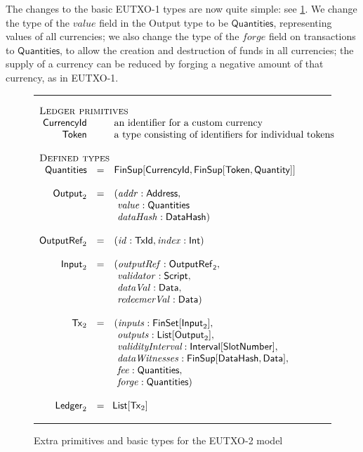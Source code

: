 \documentclass[a4paper]{article}
\renewcommand{\i}{\textit}  %
\newcommand{\s}{\textsf}  %
\newcommand{\msf}[1]{\ensuremath{\mathsf{#1}}}
\newcommand{\mi}[1]{\ensuremath{\mathit{#1}}}
\newcommand\rfskip{7pt}
\newenvironment{ruledfigure}[1]{\begin{figure}[#1]\hrule\vspace{\rfskip}}{\vspace{\rfskip}\hrule\end{figure}}
\newcommand{\List}[1]{\ensuremath{\s{List}[#1]}}
\newcommand{\FinSet}[1]{\ensuremath{\s{FinSet}[#1]}}
\newcommand{\Interval}[1]{\ensuremath{\s{Interval}[#1]}}
\newcommand{\FinSup}[2]{\ensuremath{\s{FinSup}[#1,#2]}}
\newcommand{\script}{\ensuremath{\s{Script}}}
\newcommand{\TxId}{\ensuremath{\s{TxId}}}
\newcommand{\txrefid}{\mi{id}}
\newcommand{\Address}{\ensuremath{\s{Address}}}
\newcommand{\DataHash}{\ensuremath{\s{DataHash}}}
\newcommand{\idx}{\mi{index}}
\newcommand{\inputs}{\mi{inputs}}
\newcommand{\outputs}{\mi{outputs}}
\newcommand{\forge}{\mi{forge}}
\newcommand{\fee}{\mi{fee}}
\newcommand{\addr}{\mi{addr}}
\newcommand{\val}{\mi{value}}  %
\newcommand{\validator}{\mi{validator}}
\newcommand{\redeemerVal}{\mi{redeemerVal}}
\newcommand{\dataVal}{\mi{dataVal}}
\newcommand{\dataHash}{\mi{dataHash}}
\newcommand{\dataWits}{\mi{dataWitnesses}}
\newcommand{\Data}{\ensuremath{\s{Data}}}
\newcommand{\outputref}{\mi{outputRef}}
\newcommand{\slotnum}{\ensuremath{\s{SlotNumber}}}
\newcommand{\eutxotx}{\msf{Tx}}
\newcommand{\qty}{\ensuremath{\s{Quantity}}}
\newcommand{\token}{\ensuremath{\s{Token}}}
\newcommand{\currency}{\ensuremath{\s{CurrencyId}}}
\newcommand{\qtymap}{\ensuremath{\s{Quantities}}}
\begin{document}
The changes to the basic EUTXO-1 types are now quite simple:
see \cref{fig:eutxo-2-types}.  We change the type of the $\val$ field
in the \s{Output} type to be \qtymap{}, representing values of all currencies;
we also change the type of the \forge{} field on transactions to \qtymap{}, to
allow the creation and destruction of funds in all currencies; the
supply of a currency can be reduced by forging a negative amount of that
currency, as in EUTXO-1.
\begin{ruledfigure}{H}
  \begin{displaymath}
    \begin{array}{rll}
    \multicolumn{3}{l}{\textsc{Ledger primitives}}\\
    \currency  && \mbox{an identifier for a custom currency}\\
    \token     && \mbox{a type consisting of identifiers for individual tokens}\\
    \\
    \multicolumn{3}{l}{\textsc{Defined types}}\\
    \qtymap   &=& \FinSup{\currency}{\FinSup{\token}{\qty}}\\
    \\
    \s{Output}_2 &=&(\addr: \Address,\\
                 & &\ \val: \qtymap\\
                 & &\ \dataHash: \DataHash)\\
    \\
    \s{OutputRef}_2 &= &(\txrefid: \TxId, \idx: \s{Int})\\
    \\
    \s{Input}_2 &=&( \outputref: \sf{OutputRef}_2,\\
                & &\ \validator: \script,\\
                & &\ \dataVal: \Data,\\
                & &\ \redeemerVal: \Data)\\
    \\
    \eutxotx_2 &=&(\inputs: \FinSet{\s{Input}_2},\\
               & &\ \outputs: \List{\s{Output}_2},\\
               & &\ \i{validityInterval}: \Interval{\slotnum},\\
               & &\ \dataWits: \FinSup{\DataHash}{\Data},\\
               & &\ \fee: \qtymap,\\
               & &\ \forge: \qtymap)\\
    \\
    \s{Ledger}_2 &=&\!\List{\eutxotx_2}\\
    \end{array}
  \end{displaymath}
  \caption{Extra primitives and basic types for the EUTXO-2 model}
  \label{fig:eutxo-2-types}
\end{ruledfigure}
\end{document}

